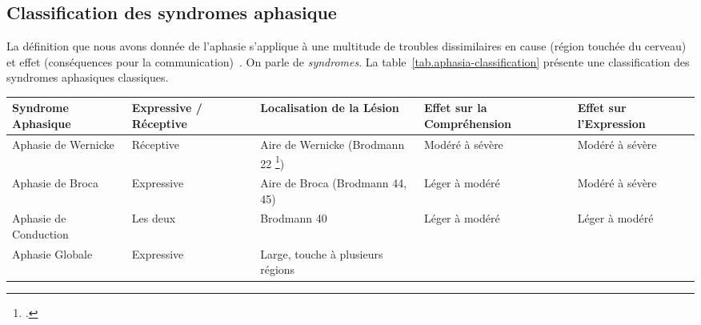 \subsection{Classification des syndromes aphasique}

La définition que nous avons donnée de l'aphasie s'applique à une multitude de troubles
dissimilaires en cause (région touchée du cerveau) 
et effet (conséquences pour la communication)~\cite{Hallowell_2017}.
On parle de \emph{syndromes}.
La table~\ref{tab.aphasia-classification} présente une classification des syndromes aphasiques classiques.
\begin{table}[ht]
    \centering
    \begin{adjustbox}{max width=15cm}
        \begin{tabular}{|p{3cm}|p{3cm}|p{3cm}|p{3cm}|p{3cm}|}
        \hline
        Syndrome Aphasique                                      & 
        Expressive / Réceptive                                  & 
        Localisation de la Lésion                               & 
        Effet sur la Compréhension                              & 
        Effet sur l'Expression                                  \\
        \hline
        Aphasie de Wernicke                                     & 
        Réceptive                                               & 
        Aire de Wernicke (Brodmann 22 \footcite{Brodmann_2007}) &
        Modéré à sévère                                         & 
        Modéré à sévère                                         \\
        \hline
        Aphasie de Broca                                        &
        Expressive                                              &
        Aire de Broca (Brodmann 44, 45)                         &
        Léger à modéré                                          &
        Modéré à sévère                                         \\
        \hline
        Aphasie de Conduction                                   &
        Les deux                                                &
        Brodmann 40                                             &
        Léger à modéré                                          &
        Léger à modéré                                          \\
        \hline
        Aphasie Globale                                         &
        Expressive                                              &
        Large, touche à plusieurs régions                       &

\end{tabular}
\end{adjustbox}
\end{table}
